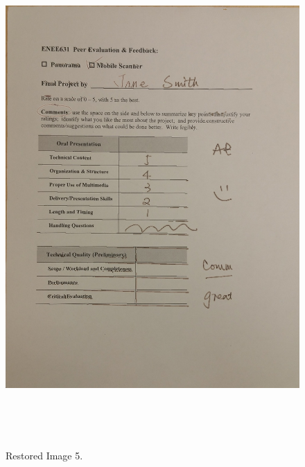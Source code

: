 \begin{figure}[th]
	\centering
	\includegraphics[height=19cm ]{Figures/test_restored_image_2}
	\caption[Restored Image 5]{Restored Image 5.}
	\label{fig:RestoredImage5}
\end{figure}
